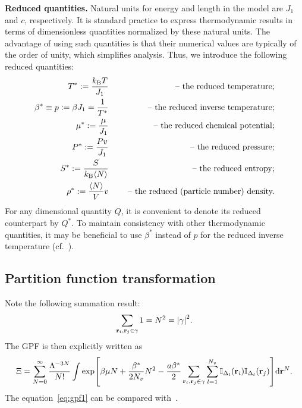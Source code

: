 \documentclass[12pt]{article}
\numberwithin{equation}{section}
\begin{document}
	\textbf{Reduced quantities.} Natural units for energy and length in the model are $J_1$ and $c$, respectively. It is standard practice to express thermodynamic results in terms of dimensionless quantities normalized by these natural units. The advantage of using such quantities is that their numerical values are typically of the order of unity, which simplifies analysis. Thus, we introduce the following reduced quantities:
	\begin{eqnarray}
		\label{def:reduced}
		T^* := \frac{k_{\rm B} T}{J_1} & \quad & \text{ -- the reduced temperature;} 
		\nonumber\\
		\beta^* \equiv p := \beta J_1 = \frac{1}{T^*} & \quad & \text{ -- the reduced inverse temperature;}
		\nonumber\\
		\mu^* := \frac{\mu}{J_1} & \quad & \text{ -- the reduced chemical potential;}
		\nonumber\\ 
		P^* := \frac{Pv}{J_1} & & \text{ -- the reduced pressure;}
		\nonumber\\
		S^* := \frac{S}{k_{\rm B} \langle N \rangle} & & \text{ -- the reduced entropy;}
		\nonumber\\
		\rho^* := \frac{\langle N \rangle}{V} v && \text{ -- the reduced (particle number) density.}
	\end{eqnarray}
	For any dimensional quantity $Q$, it is convenient to denote its reduced counterpart by $Q^*$. To maintain consistency with other thermodynamic quantities, it may be beneficial to use $\beta^*$ instead of $p$ for the reduced inverse temperature (cf.~\cite{RDGMR13}).
	
	\subsection{Partition function transformation}
	Note the following summation result:
	\begin{equation}
		\sum_{\vb{r}_i,\vb{r}_j \in \gamma} 1 = N^2 = \abs{\gamma}^2.
	\end{equation}
	The GPF is then explicitly written as
	\begin{equation}
		\label{eq:gpf1}
		\Xi = \sum_{N=0}^{\infty} \frac{\Lambda^{-3N}}{N!}
		\int
		\exp[\beta\mu N + \frac{\beta^*}{2N_{v}} N^2 - \frac{a\beta^*}{2} \sum_{\vb{r}_i,\vb{r}_j \in \gamma} \sum_{l=1}^{N_v} \mathbb{I}_{\Delta_l}(\vb{r}_i)\mathbb{I}_{\Delta_l}(\vb{r}_j)] {\rm d} \vb{r}^N.
	\end{equation}
	The equation~\eqref{eq:gpf1} can be compared with~\cite[(2.5)]{KKD20}.
	
\end{document}
